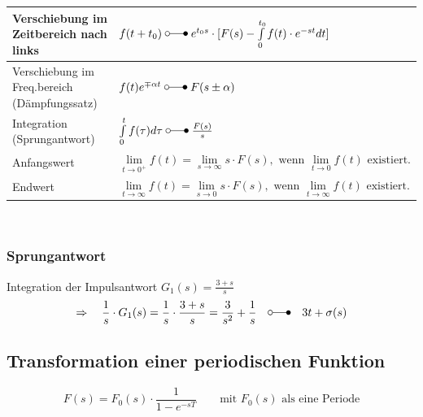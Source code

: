 \begin{tabular}{|l|l|}
  					Verschiebung im Zeitbereich nach links &
  					$f(t + t_0) \; \laplace \; e^{t_0 s} \cdot [F(s) - \int\limits_0^{t_0} f(t) \cdot e^{-st} dt]$\\
  					\hline
  		 			Verschiebung im Freq.bereich (Dämpfungssatz) &
  		 			$f(t)e^{\mp\alpha t} \; \laplace \; F(s\pm\alpha)$ \\
  		 			\hline
  		 			Integration (Sprungantwort)&
  		 			$\int\limits_0^t f(\tau)d\tau \; \laplace \; \frac{F(s)}{s}$ \\
  		 			\hline
  		 			Anfangswert &
  		 			$\lim\limits_{t\rightarrow 0^+} f(t) = \lim\limits_{s\rightarrow \infty} s\cdot F(s),\text{~wenn
  		 			}  \lim\limits_{t\rightarrow 0} f(t)\text{~existiert}.$ \\
  		 			\hline
  		 			Endwert &
  		 			$\lim\limits_{t\rightarrow \infty} f(t) = \lim\limits_{s\rightarrow 0} s\cdot F(s),\text{~wenn
  		 			}  \lim\limits_{t\rightarrow \infty} f(t)\text{~existiert}.$ \\
  		 			\hline
  		       	\end{tabular}\\
  		  \renewcommand{\arraystretch}{1.8}
  				
	\subsubsection{Sprungantwort} 
	Integration der Impulsantwort $G_1(s) = \frac{3+s}{s}$\\ 
	\[\Rightarrow \quad \frac{1}{s}\cdot G_1(s)= \frac{1}{s}\cdot\frac{3+s}{s}=\frac{3}{s^2}+\frac{1}{s} \quad \laplace \quad 3t +\sigma(s)\]
	
	\subsection{Transformation einer periodischen Funktion  }
		\[ F(s) = F_0(s)\cdot\dfrac{1}{1 - e^{-sT}} \qquad \text{mit } F_0(s) \text{ als eine Periode}\] 


\newpage
